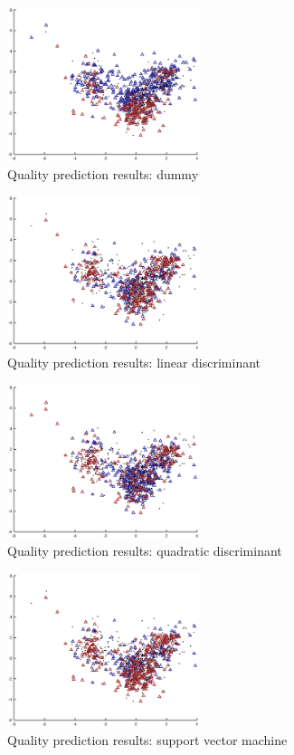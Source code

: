 \documentclass[twoside]{article}
\begin{document}
\begin{multicols}{2}
\begin{figure}[H]
\centering
\includegraphics[width=0.5\textwidth]{rankpca/dummy}
\caption{Quality prediction results: dummy}
\end{figure}

\begin{figure}[H]
\centering
\includegraphics[width=0.5\textwidth]{rankpca/lindiscr}
\caption{Quality prediction results: linear discriminant}
\end{figure}

\begin{figure}[H]
\centering
\includegraphics[width=0.5\textwidth]{rankpca/quaddiscr}
\caption{Quality prediction results: quadratic discriminant}
\end{figure}

\begin{figure}[H]
\centering
\includegraphics[width=0.5\textwidth]{rankpca/svm}
\caption{Quality prediction results: support vector machine}
\end{figure}


\end{multicols}
\end{document}
